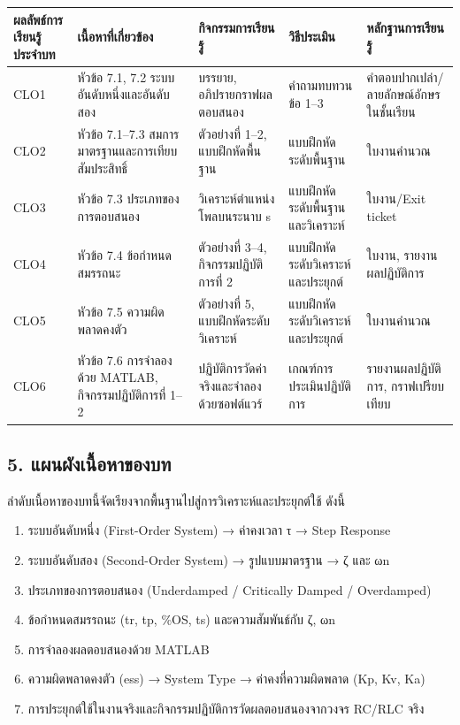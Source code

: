 \begin{table}[htbp]
    \centering
    \small
    \begin{tabularx}{\textwidth}{@{}>{\raggedright\arraybackslash}p{}*{4}{>{\raggedright\arraybackslash}X}@{}}
        \hline
        \textbf{ผลลัพธ์การเรียนรู้ประจำบท} & \textbf{เนื้อหาที่เกี่ยวข้อง} & \textbf{กิจกรรมการเรียนรู้} & \textbf{วิธีประเมิน} & \textbf{หลักฐานการเรียนรู้} \\
        \hline
        CLO1 & หัวข้อ 7.1, 7.2 ระบบอันดับหนึ่งและอันดับสอง & บรรยาย, อภิปรายกราฟผลตอบสนอง & คำถามทบทวนข้อ 1–3 & คำตอบปากเปล่า/ลายลักษณ์อักษรในชั้นเรียน \\
        CLO2 & หัวข้อ 7.1–7.3 สมการมาตรฐานและการเทียบสัมประสิทธิ์ & ตัวอย่างที่ 1–2, แบบฝึกหัดพื้นฐาน & แบบฝึกหัดระดับพื้นฐาน & ใบงานคำนวณ \\
        CLO3 & หัวข้อ 7.3 ประเภทของการตอบสนอง & วิเคราะห์ตำแหน่งโพลบนระนาบ s & แบบฝึกหัดระดับพื้นฐานและวิเคราะห์ & ใบงาน/Exit ticket \\
        CLO4 & หัวข้อ 7.4 ข้อกำหนดสมรรถนะ & ตัวอย่างที่ 3–4, กิจกรรมปฏิบัติการที่ 2 & แบบฝึกหัดระดับวิเคราะห์และประยุกต์ & ใบงาน, รายงานผลปฏิบัติการ \\
        CLO5 & หัวข้อ 7.5 ความผิดพลาดคงตัว & ตัวอย่างที่ 5, แบบฝึกหัดระดับวิเคราะห์ & แบบฝึกหัดระดับวิเคราะห์และประยุกต์ & ใบงานคำนวณ \\
        CLO6 & หัวข้อ 7.6 การจำลองด้วย MATLAB, กิจกรรมปฏิบัติการที่ 1–2 & ปฏิบัติการวัดค่าจริงและจำลองด้วยซอฟต์แวร์ & เกณฑ์การประเมินปฏิบัติการ & รายงานผลปฏิบัติการ, กราฟเปรียบเทียบ \\
        \hline
    \end{tabularx}
\end{table}



\subsection{5. แผนผังเนื้อหาของบท}

ลำดับเนื้อหาของบทนี้จัดเรียงจากพื้นฐานไปสู่การวิเคราะห์และประยุกต์ใช้ ดังนี้

\begin{enumerate}
    \item ระบบอันดับหนึ่ง (First-Order System) → ค่าคงเวลา τ → Step Response
    \item ระบบอันดับสอง (Second-Order System) → รูปแบบมาตรฐาน → ζ และ ωn
    \item ประเภทของการตอบสนอง (Underdamped / Critically Damped / Overdamped)
    \item ข้อกำหนดสมรรถนะ (tr, tp, \%OS, ts) และความสัมพันธ์กับ ζ, ωn
    \item การจำลองผลตอบสนองด้วย MATLAB
    \item ความผิดพลาดคงตัว (ess) → System Type → ค่าคงที่ความผิดพลาด (Kp, Kv, Ka)
    \item การประยุกต์ใช้ในงานจริงและกิจกรรมปฏิบัติการวัดผลตอบสนองจากวงจร RC/RLC จริง
\end{enumerate}

